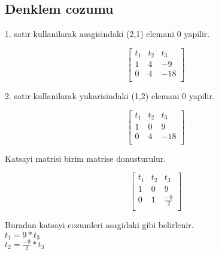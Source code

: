 \documentclass{article}
\begin{document}
\subsection{Denklem cozumu}
1. satir kullanilarak  asagisindaki (2,1) elemani 0 yapilir.\begin{center}
$$ \left[\begin{array}{rr|r}
t_{1} & t_{2} & t_{3}\\
1 & 4 & -9\\
0 & 4 & -18\\
\end{array}\right] $$
\end{center}
2. satir kullanilarak  yukarisindaki (1,2) elemani 0 yapilir.\begin{center}
$$ \left[\begin{array}{rr|r}
t_{1} & t_{2} & t_{3}\\
1 & 0 & 9\\
0 & 4 & -18\\
\end{array}\right] $$
\end{center}
Katsayi matrisi birim matrise donusturulur.
\begin{center}
$$ \left[\begin{array}{rr|r}
t_{1} & t_{2} & t_{3}\\
1 & 0 & 9\\
0 & 1 & \frac{-9}{2}\\
\end{array}\right] $$
\end{center}
Buradan katsayi cozumleri asagidaki gibi belirlenir.\\
$\displaystyle t_{1}=9*t_{3}$\\
$\displaystyle t_{2}=\frac{-9}{2}*t_{3}$\\
\end{document}
